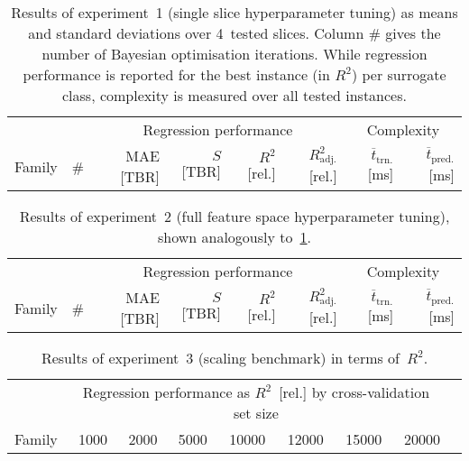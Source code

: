 \begin{table}[!hbt]
	\centering
	{\scriptsize
		\begin{tabular}{lrrrrrrr}
		\toprule
		{} & {} & \multicolumn{4}{c}{Regression performance} &
		\multicolumn{2}{c}{Complexity}\\
		\cmidrule(lr){3-6}
		\cmidrule(lr){7-8}
		Family & \# & MAE [TBR] & $S$ [TBR] & $R^2$ [rel.] & $R^2_{\text{adj.}}$ [rel.]
						& $\overline{t}_{\text{trn.}}$ [\si{\milli\second}] &
						$\overline{t}_{\text{pred.}}$ [\si{\milli\second}]\\
		\midrule
		
		\bottomrule
		\end{tabular}
	}
	\caption{Results of experiment~1 (single slice hyperparameter tuning) as
		means and standard deviations over 4~tested slices. Column \# gives the number of Bayesian
		optimisation iterations. While regression performance is reported for the
		best instance (in $R^2$) per surrogate class, complexity is measured over all tested instances.}
	\label{tbl:exp1-detailed-results}
\end{table}

\begin{table}[!hbt]
	\centering
	{\scriptsize
		\begin{tabular}{lrrrrrrr}
		\toprule
		{} & {} & \multicolumn{4}{c}{Regression performance} &
		\multicolumn{2}{c}{Complexity}\\
		\cmidrule(lr){3-6}
		\cmidrule(lr){7-8}
		Family & \# & MAE [TBR] & $S$ [TBR] & $R^2$ [rel.] & $R^2_{\text{adj.}}$ [rel.]
						& $\overline{t}_{\text{trn.}}$ [\si{\milli\second}] &
						$\overline{t}_{\text{pred.}}$ [\si{\milli\second}]\\
		\midrule
		
		\bottomrule
		\end{tabular}
	}
	\caption{Results of experiment~2 (full feature space hyperparameter tuning),
		shown analogously to~\cref{tbl:exp1-detailed-results}.}
	\label{tbl:exp2-detailed-results}
\end{table}

\begin{table}[!hbt]
	\centering
	\setlength\tabcolsep{5pt}
	{\scriptsize
		\begin{tabular}{lrrrrrrrr}
		\toprule
		{} & \multicolumn{7}{c}{Regression performance as $R^2$~[rel.] by cross-validation set size}\\
		\cmidrule(lr){2-8}
		Family
						& \num{1000}
						& \num{2000}
						& \num{5000}
						& \num{10000}
						& \num{12000}
						& \num{15000}
						& \num{20000}\\
		\midrule
		
		\bottomrule
		\end{tabular}
	}
	\caption{Results of experiment~3 (scaling benchmark) in ter\si{\milli\second} of~$R^2$.}
	\label{tbl:exp3-detailed-results-r2}
\end{table}

